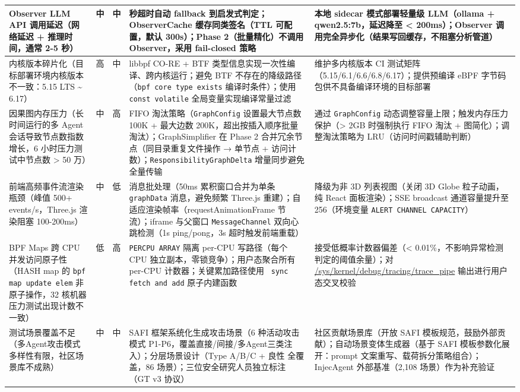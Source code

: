 \documentclass[a4paper]{ctexart}
\makeatletter
\renewcommand{\_}{%
  \ifmmode
    \nfss@text{\textunderscore}%
  \else
    \textunderscore\discretionary{}{}{}%
  \fi}
\makeatother
\begin{document}
{\begin{longtable}{>{\raggedright\arraybackslash}p{3.8cm} c c >{\raggedright\arraybackslash}p{4.0cm} >{\raggedright\arraybackslash}p{4.0cm}}
Observer LLM API 调用延迟（网络延迟 + 推理时间，通常 2-5 秒） & 中 & 中 & 2 秒超时自动 fallback 到启发式判定；ObserverCache 缓存同类签名（TTL 可配置，默认 300s）；Phase 2（批量精化）不调用 Observer，采用 fail-closed 策略 & 本地 sidecar 模式部署轻量级 LLM（ollama + qwen2.5:7b，延迟降至 < 200ms）；Observer 调用完全异步化（结果写回缓存，不阻塞分析管道） \\
\hline
内核版本碎片化（目标部署环境内核版本不一致：5.15 LTS \textasciitilde{} 6.17） & 高 & 中 & libbpf CO-RE + BTF 类型信息实现一次性编译、跨内核运行；避免 BTF 不存在的降级路径（\texttt{bpf\_core\_type\_exists} 编译时条件）；使用 \texttt{const volatile} 全局变量实现编译常量过滤 & 维护多内核版本 CI 测试矩阵（5.15/6.1/6.6/6.8/6.17）；提供预编译 eBPF 字节码包供不具备编译环境的目标部署 \\
\hline
因果图内存压力（长时间运行的多 Agent 会话导致节点数指数增长，6 小时压力测试中节点数 > 50 万） & 中 & 高 & FIFO 淘汰策略（\texttt{GraphConfig} 设置最大节点数 100K + 最大边数 200K，超出按插入顺序批量淘汰）；GraphSimplifier 在 Phase 2 合并冗余节点（同目录重复文件操作 → 单节点 + 访问计数）；\texttt{ResponsibilityGraphDelta} 增量同步避免全量传输 & 通过 \texttt{GraphConfig} 动态调整容量上限；触发内存压力保护（> 2GB 时强制执行 FIFO 淘汰 + 图简化）；调整淘汰策略为 LRU（访问时间戳辅助判断） \\
\hline
前端高频事件流渲染瓶颈（峰值 500+ events/s，Three.js 渲染阻塞 100-200ms） & 中 & 低 & 消息批处理（50ms 累积窗口合并为单条 \texttt{graphData} 消息，避免频繁 Three.js 重建）；自适应渲染帧率（requestAnimationFrame 节流）；iframe 与父窗口 \texttt{MessageChannel} 双向心跳检测（1s ping/pong，3s 超时触发前端重载） & 降级为非 3D 列表视图（关闭 3D Globe 粒子动画，纯 React 面板渲染）；SSE broadcast 通道容量提升至 256（环境变量 \texttt{ALERT\_CHANNEL\_CAPACITY}） \\
\hline
BPF Maps 跨 CPU 并发访问原子性（HASH map 的 \texttt{bpf\_map\_update\_elem} 非原子操作，32 核机器压力测试出现计数不一致） & 低 & 高 & \texttt{PERCPU\_ARRAY} 隔离 per-CPU 写路径（每个 CPU 独立副本，零锁竞争）；用户态聚合所有 per-CPU 计数器；关键累加路径使用 \texttt{\_\_sync\_fetch\_and\_add} 原子内建函数 & 接受低概率计数器偏差（< 0.01\%，不影响异常检测判定的阈值余量）；对 \url{/sys/kernel/debug/tracing/trace_pipe} 输出进行用户态交叉校验 \\
\hline
测试场景覆盖不足（多Agent攻击模式多样性有限，社区场景库不成熟） & 中 & 中 & SAFI 框架系统化生成攻击场景（6 种活动攻击模式 P1-P6，覆盖直接/间接/多Agent三类注入）；分层场景设计（Type A/B/C + 良性 全覆盖，86 场景）；三位安全研究人员独立标注（GT v3 协议） & 社区贡献场景库（开放 SAFI 模板规范，鼓励外部贡献）；自动场景变体生成器（基于 SAFI 模板参数化展开：prompt 文案重写、载荷拆分策略组合）；InjecAgent 外部基准（2,108 场景）作为补充验证 \\
\hline
\end{longtable}
\par}
\end{document}
